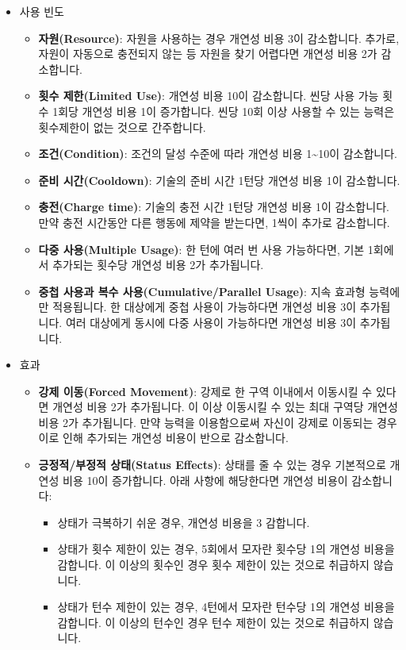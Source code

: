 \documentclass{report}
\begin{document}
\begin{itemize}
		\item 사용 빈도
		\begin{itemize}
			\item \textbf{자원(Resource)}: 자원을 사용하는 경우 개연성 비용 3이 감소합니다. 추가로, 자원이 자동으로 충전되지 않는 등 자원을 찾기 어렵다면 개연성 비용 2가 감소합니다.
			\item \textbf{횟수 제한(Limited Use)}: 개연성 비용 10이 감소합니다. 씬당 사용 가능 횟수 1회당 개연성 비용 1이 증가합니다. 씬당 10회 이상 사용할 수 있는 능력은 횟수제한이 없는 것으로 간주합니다.
			\item \textbf{조건(Condition)}: 조건의 달성 수준에 따라 개연성 비용 1\textasciitilde10이 감소합니다.
			\item \textbf{준비 시간(Cooldown)}: 기술의 준비 시간 1턴당 개연성 비용 1이 감소합니다.
			\item \textbf{충전(Charge time)}: 기술의 충전 시간 1턴당 개연성 비용 1이 감소합니다. 만약 충전 시간동안 다른 행동에 제약을 받는다면, 1씩이 추가로 감소합니다.
			\item \textbf{다중 사용(Multiple Usage)}: 한 턴에 여러 번 사용 가능하다면, 기본 1회에서 추가되는 횟수당 개연성 비용 2가 추가됩니다.
			\item \textbf{중첩 사용과 복수 사용(Cumulative/Parallel Usage)}: 지속 효과형 능력에만 적용됩니다. 한 대상에게 중첩 사용이 가능하다면 개연성 비용 3이 추가됩니다. 여러 대상에게 동시에 다중 사용이 가능하다면 개연성 비용 3이 추가됩니다.
		\end{itemize}
		
		\item 효과
		\begin{itemize}
			\item \textbf{강제 이동(Forced Movement)}: 강제로 한 구역 이내에서 이동시킬 수 있다면 개연성 비용 2가 추가됩니다. 이 이상 이동시킬 수 있는 최대 구역당 개연성 비용 2가 추가됩니다. 만약 능력을 이용함으로써 자신이 강제로 이동되는 경우 이로 인해 추가되는 개연성 비용이 반으로 감소합니다.
			\item \textbf{긍정적/부정적 상태(Status Effects)}: 상태를 줄 수 있는 경우 기본적으로 개연성 비용 10이 증가합니다. 아래 사항에 해당한다면 개연성 비용이 감소합니다:
			\begin{itemize}
				\item 상태가 극복하기 쉬운 경우, 개연성 비용을 3 감합니다.
				\item 상태가 횟수 제한이 있는 경우, 5회에서 모자란 횟수당 1의 개연성 비용을 감합니다. 이 이상의 횟수인 경우 횟수 제한이 있는 것으로 취급하지 않습니다.
				\item 상태가 턴수 제한이 있는 경우, 4턴에서 모자란 턴수당 1의 개연성 비용을 감합니다. 이 이상의 턴수인 경우 턴수 제한이 있는 것으로 취급하지 않습니다.
			\end{itemize}
		\end{itemize}
		

\end{itemize}
\end{document}
